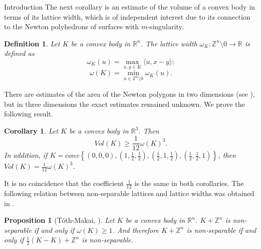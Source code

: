 \documentclass[12pt]{article}
\newcommand\R{\mathbb R}
\newcommand\Z{\mathbb Z}
\newtheorem{proposition}{Proposition}[section]
\newtheorem{definition}{Definition}[section]
\newtheorem{Corollary}{Corollary}[section]
\begin{document}
\begin{section}{Introduction}
    The next corollary is an estimate of the volume of a  convex body in terms of its lattice width, which is of independent interest due to its connection to the Newton 
polyhedrons of surfaces with $m$-singularity. 

 \begin{definition} Let $K$ be a convex body in $\R^{n}$. The 
        lattice width $\omega_{K}:\Z^{n}\setminus{0}\to \R$ is defined as 
        $$
        \omega_{K}(u)=\max_{x,y\in K}\langle u, x-y\rangle;
        $$
        $$
            \omega(K) = \min_{u\in \mathbb{Z}^{n}\setminus 0} \omega_{K}(u).
        $$
    \end{definition}



There are estimates of the area of the Newton polygons in two dimensions (see \cite{nk1,nk2}), but in three dimensions the exact estimates remained unknown. We prove the following result.  
    \begin{Corollary}
    \label{lattice-width}
        Let $K$ be a convex body in $\R^{3}$. Then 
         $$
            Vol(K)\geq \frac{1}{12}\omega(K)^3.
         $$
    In addition, if $K = conv\left\{(0,0,0),  \left(1,\frac{1}{2},\frac{1}{2}\right),\left(\frac{1}{2},1,\frac{1}{2}\right),\left(\frac{1}{2},\frac{1}{2},1\right)\right\}$, then $Vol(K) = \frac{1}{12}\omega(K)^3.$
    \end{Corollary}

    It is no coincidence that the coefficient $\frac{1}{12}$ is the same in both corollaries. The following relation between non-separable lattices and lattice widths was obtained in \cite{makai1974}.

    \begin{proposition}
    [T\' oth-Makai, \cite{makai1974}]
    \label{nonsep}  Let $K$ be a convex body in $\R^{n}$.
        $K+\Z^{n}$ is non-separable if and only if $\omega(K)\geq 1$.  And therefore $K+\Z^{n}$ is non-separable if and only if $\frac{1}{2}(K-K)+\Z^{n}$ is non-separable.  
    \end{proposition}

    

    
        
\end{section}
\end{document}
